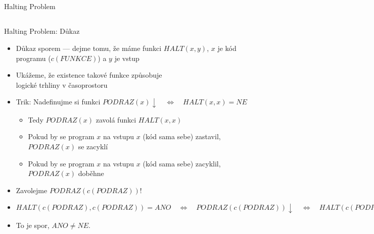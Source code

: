 \documentclass{beamer}
\begin{document}
\subsection{}
\begin{frame}{Halting Problem}
\end{frame}

\subsection{}
\begin{frame}{Halting Problem: Důkaz}
\begin{itemize}
\item Důkaz sporem --- dejme tomu, že máme funkci $HALT(x,y)$, $x$ je kód programu ($c(FUNKCE)$) a $y$ je vstup
\item Ukážeme, že existence takové funkce způsobuje \\ logické trhliny v časoprostoru
\pause
\item Trik: Nadefinujme si funkci $PODRAZ(x) \downarrow \quad \Longleftrightarrow \quad HALT(x,x)=NE$
\begin{itemize}
\item Tedy $PODRAZ(x)$ zavolá funkci $HALT(x,x)$
\item Pokud by se program $x$ na vstupu $x$ (kód sama sebe) zastavil, $PODRAZ(x)$ se zacyklí
\item Pokud by se program $x$ na vstupu $x$ (kód sama sebe) zacyklil, $PODRAZ(x)$ doběhne
\end{itemize}
\pause
\item Zavolejme $PODRAZ(c(PODRAZ))$!
\item $HALT(c(PODRAZ),c(PODRAZ)) = ANO \quad \Longleftrightarrow \quad PODRAZ(c(PODRAZ)) \downarrow \quad \Longleftrightarrow \quad HALT(c(PODRAZ),c(PODRAZ)) = NE$
\item To je spor, $ANO \ne NE$.
\end{itemize}
\end{frame}
\end{document}
